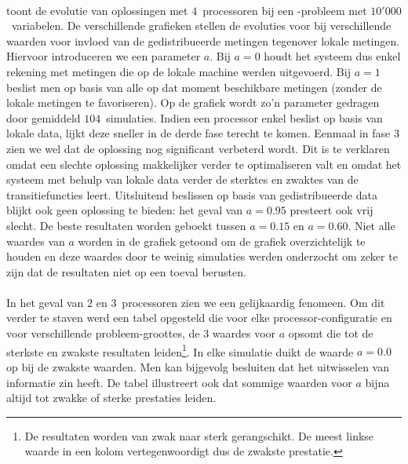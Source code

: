 \paragraph{}
 toont de evolutie van oplossingen met $4$~processoren bij een -probleem met $10'000$~variabelen. De verschillende grafieken stellen de evoluties voor bij verschillende waarden voor invloed van de gedistribueerde metingen tegenover lokale metingen. Hiervoor introduceren we een parameter $a$. Bij $a=0$ houdt het systeem dus enkel rekening met metingen die op de lokale machine werden uitgevoerd. Bij $a=1$ beslist men op basis van alle op dat moment beschikbare metingen (zonder de lokale metingen te favoriseren). Op de grafiek wordt zo'n parameter gedragen door gemiddeld $104$~simulaties. Indien een processor enkel beslist op basis van lokale data, lijkt deze sneller in de derde fase terecht te komen. Eenmaal in fase $3$ zien we wel dat de oplossing nog significant verbeterd wordt. Dit is te verklaren omdat een slechte oplossing makkelijker verder te optimaliseren valt en omdat het systeem met behulp van lokale data verder de sterktes en zwaktes van de transitiefuncties leert. Uitsluitend beslissen op basis van gedistribueerde data blijkt ook geen oplossing te bieden: het geval van $a=0.95$ presteert ook vrij slecht. De beste resultaten worden geboekt tussen $a=0.15$ en $a=0.60$. Niet alle waardes van $a$ worden in de grafiek getoond om de grafiek overzichtelijk te houden en deze waardes door te weinig simulaties werden onderzocht om zeker te zijn dat de resultaten niet op een toeval berusten.

\paragraph{}

In het geval van $2$ en $3$~processoren zien we een gelijkaardig fenomeen. Om dit verder te staven werd een tabel opgesteld die voor elke processor-configuratie en voor verschillende probleem-groottes, de $3$ waardes voor $a$ opsomt die tot de sterkste en zwakste resultaten leiden\footnote{De resultaten worden van zwak naar sterk gerangschikt. De meest linkse waarde in een kolom vertegenwoordigt dus de zwakste prestatie.}. In elke simulatie duikt de waarde $a=0.0$ op bij de zwakste waarden. Men kan bijgevolg besluiten dat het uitwisselen van informatie zin heeft. De tabel illustreert ook dat sommige waarden voor $a$ bijna altijd tot zwakke of sterke prestaties leiden.

